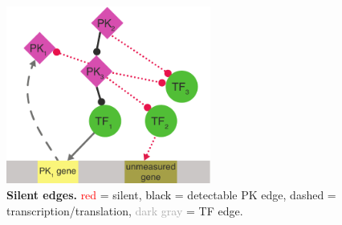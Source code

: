 \begin{figure}[ht]
    \centering
    \includegraphics[width=0.6\textwidth]{theory/fig/unobservable.pdf}
    \caption{\textbf{Silent edges.} \textcolor{red}{red} = silent, \textcolor{black}{black} = detectable PK edge, dashed = transcription/translation, \textcolor{darkgray}{dark gray} = TF edge. }
    \label{fig:unobservable}
\end{figure}
